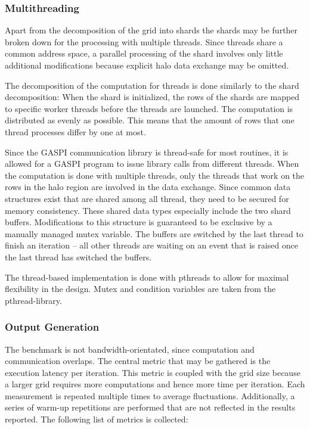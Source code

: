 \subsubsection*{Multithreading}

Apart from the decomposition of the grid into shards the shards may be further broken down for the processing with multiple threads. Since threads share a common address space, a parallel processing of the shard involves only little additional modifications because explicit halo data exchange may be omitted.

The decomposition of the computation for threads is done similarly to the shard decomposition: When the shard is initialized, the rows of the shards are mapped to specific worker threads before the threads are launched. The computation is distributed as evenly as possible. This means that the amount of rows that one thread processes differ by one at most.

Since the \ac{GASPI} communication library is thread-safe for most routines, it is allowed for a \ac{GASPI} program to issue library calls from different threads. When the computation is done with multiple threads, only the threads that work on the rows in the halo region are involved in the data exchange. Since common data structures exist that are shared among all thread, they need to be secured for memory consistency. These shared data types especially include the two shard buffers. Modifications to this structure is guaranteed to be exclusive by a manually managed mutex variable. The buffers are switched by the last thread to finish an iteration -- all other threads are waiting on an event that is raised once the last thread has switched the buffers. 

The thread-based implementation is done with pthreads to allow for maximal flexibility in the design. Mutex and condition variables are taken from the pthread-library. 

\subsubsection*{Output Generation}

The benchmark is not bandwidth-orientated, since computation and communication overlaps. The central metric that may be gathered is the execution latency per iteration. This metric is coupled with the grid size because a larger grid requires more computations and hence more time per iteration. Each measurement is repeated multiple times to average fluctuations. Additionally, a series of warm-up repetitions are performed that are not reflected in the results reported. The following list of metrics is collected:


